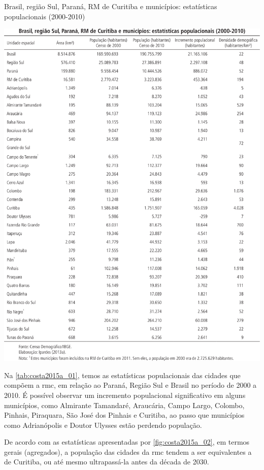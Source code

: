 	\begin{table}
		\centering
		\caption{Brasil, região Sul, Paraná, RM de Curitiba e municípios: estatísticas populacionais (2000-2010)}
		\includegraphics[width=1.0\linewidth]{img/costa2015a_01}
		\label{tab:costa2015a_01}
	\end{table}
	
	Na \autoref{tab:costa2015a_01}, temos as estatísticas populacionais das cidades que compõem a \glsdesc{rmc}, em relação ao Paraná, Região Sul e Brasil no período de 2000 a 2010. É possível observar um incremento populacional significativo em alguns municípios, como Almirante Tamandaré, Araucária, Campo Largo, Colombo, Pinhais, Piraquara, São José dos Pinhais e Curitiba, ao passo que municípios como Adrianópolis e Doutor Ulysses estão perdendo população. 
	
	De acordo com as estatísticas apresentadas por \autoref{fig:costa2015a_02}, em termos gerais (agregados), a população das cidades da \glsdesc{rmc} tendem a ser equivalentes a de Curitiba, ou até mesmo ultrapassá-la antes da década de 2030.
	
